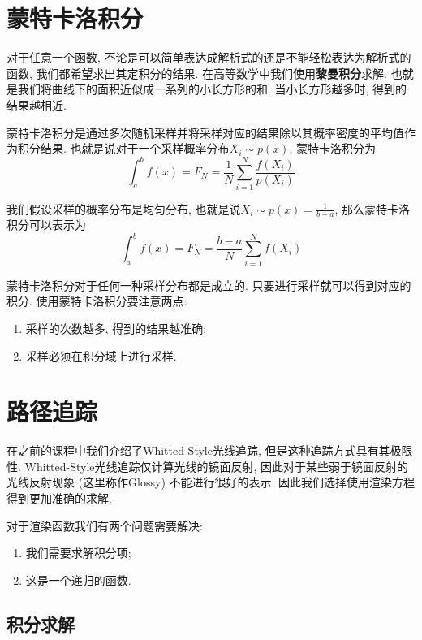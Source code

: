 \section{蒙特卡洛积分}

对于任意一个函数, 不论是可以简单表达成解析式的还是不能轻松表达为解析式的函数, 我们都希望求出其定积分的结果. 在高等数学中我们使用\textbf{黎曼积分}求解. 也就是我们将曲线下的面积近似成一系列的小长方形的和. 当小长方形越多时, 得到的结果越相近. 

蒙特卡洛积分是通过多次随机采样并将采样对应的结果除以其概率密度的平均值作为积分结果. 也就是说对于一个采样概率分布$X_i\sim p(x)$, 蒙特卡洛积分为
\begin{equation}
	\int_a^b f(x) = F_N=\frac{1}{N}\sum_{i=1}^N\frac{f(X_i)}{p(X_i)}
\end{equation}

我们假设采样的概率分布是均匀分布, 也就是说$X_i\sim p(x)=\frac{1}{b-a}$, 那么蒙特卡洛积分可以表示为
\begin{equation}
	\int_a^b f(x) = F_N=\frac{b-a}{N}\sum_{i=1}^Nf(X_i)
\end{equation}

蒙特卡洛积分对于任何一种采样分布都是成立的. 只要进行采样就可以得到对应的积分. 使用蒙特卡洛积分要注意两点: 
\begin{enumerate}
	\item 采样的次数越多, 得到的结果越准确; 
	\item 采样必须在积分域上进行采样. 
\end{enumerate}

\section{路径追踪}
在之前的课程中我们介绍了Whitted-Style光线追踪, 但是这种追踪方式具有其极限性. Whitted-Style光线追踪仅计算光线的镜面反射, 因此对于某些弱于镜面反射的光线反射现象 (这里称作Glossy) 不能进行很好的表示. 因此我们选择使用渲染方程得到更加准确的求解. 

对于渲染函数我们有两个问题需要解决: 
\begin{enumerate}
	\item 我们需要求解积分项; 
	\item 这是一个递归的函数. 
\end{enumerate}

\subsection{积分求解}

